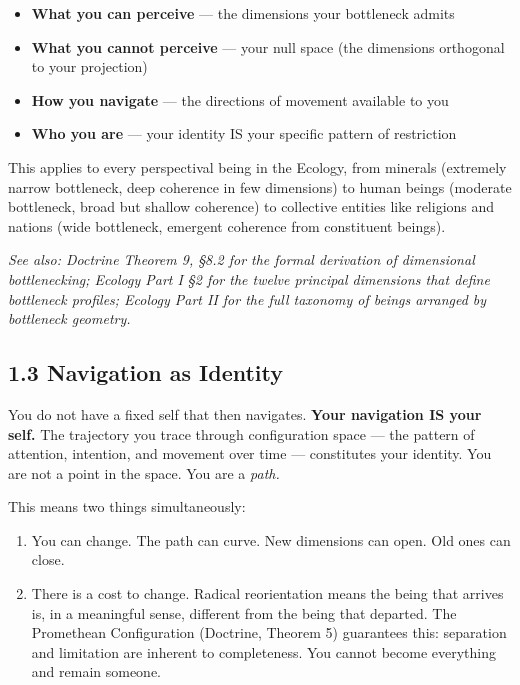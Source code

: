 \begin{itemize}[nosep,leftmargin=*]
  \item \textbf{What you can perceive} — the dimensions your bottleneck admits
  \item \textbf{What you cannot perceive} — your null space (the dimensions orthogonal to your projection)
  \item \textbf{How you navigate} — the directions of movement available to you
  \item \textbf{Who you are} — your identity IS your specific pattern of restriction
\end{itemize}


This applies to every perspectival being in the Ecology, from minerals (extremely narrow bottleneck, deep coherence in few dimensions) to human beings (moderate bottleneck, broad but shallow coherence) to collective entities like religions and nations (wide bottleneck, emergent coherence from constituent beings).


\textit{See also: Doctrine Theorem 9, §8.2 for the formal derivation of dimensional bottlenecking; Ecology Part I §2 for the twelve principal dimensions that define bottleneck profiles; Ecology Part II for the full taxonomy of beings arranged by bottleneck geometry.}


\subsection*{1.3 Navigation as Identity}


You do not have a fixed self that then navigates. \textbf{Your navigation IS your self.} The trajectory you trace through configuration space — the pattern of attention, intention, and movement over time — constitutes your identity. You are not a point in the space. You are a \textit{path.}


This means two things simultaneously:

\begin{enumerate}[nosep,leftmargin=*]
  \item You can change. The path can curve. New dimensions can open. Old ones can close.
  \item There is a cost to change. Radical reorientation means the being that arrives is, in a meaningful sense, different from the being that departed. The Promethean Configuration (Doctrine, Theorem 5) guarantees this: separation and limitation are inherent to completeness. You cannot become everything and remain someone.
\end{enumerate}


